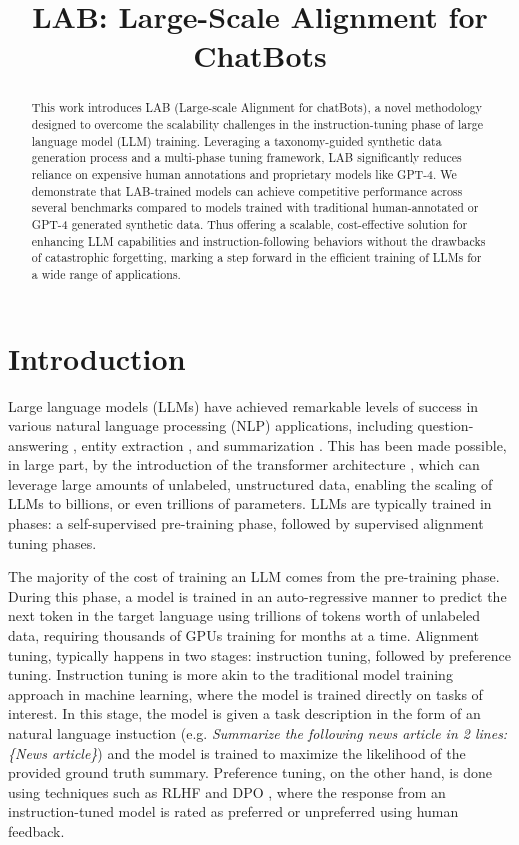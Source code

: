 \title{LAB: Large-Scale Alignment for ChatBots}



\maketitle

\begin{abstract}
This work introduces LAB (Large-scale Alignment for chatBots), a novel methodology designed to overcome the scalability challenges in the instruction-tuning phase of large language model (LLM) training. Leveraging a taxonomy-guided synthetic data generation process and a multi-phase tuning framework, LAB significantly reduces reliance on expensive human annotations and proprietary models like GPT-4. We demonstrate that LAB-trained models can achieve competitive performance across several benchmarks compared to models trained with traditional human-annotated or GPT-4 generated synthetic data. Thus offering a scalable, cost-effective solution for enhancing LLM capabilities and instruction-following behaviors without the drawbacks of catastrophic forgetting, marking a step forward in the efficient training of LLMs for a wide range of applications.
\end{abstract}

\section{Introduction}

Large language models (LLMs) have achieved remarkable levels of success in various natural language processing (NLP) applications, including question-answering \cite{}, entity extraction \cite{}, and summarization \cite{}. This has been made possible, in large part, by the introduction of the transformer architecture \cite{}, which can leverage large amounts of unlabeled, unstructured data, enabling the scaling of LLMs to billions, or even trillions of parameters. LLMs are typically trained in phases: a self-supervised pre-training phase, followed by supervised alignment tuning phases. 

The majority of the cost of training an LLM comes from the pre-training phase. During this phase, a model is trained in an auto-regressive manner to predict the next token in the target language using trillions of tokens worth of unlabeled data, requiring thousands of GPUs training for months at a time. Alignment tuning, typically happens in two stages: instruction tuning, followed by preference tuning. Instruction tuning is more akin to the traditional model training approach in machine learning, where the model is trained directly on tasks of interest. In this stage, the model is given a task description in the form of an natural language instuction (e.g. \textit{Summarize the following news article in 2 lines: \{News article\}}) and the model is trained to maximize the likelihood of the provided ground truth summary. Preference tuning, on the other hand, is done using techniques such as RLHF \citep{stiennon2022learning,ouyang2022training} and DPO \citep{rafailov2023direct}, where the response from an instruction-tuned model is rated as preferred or unpreferred using human feedback. 

